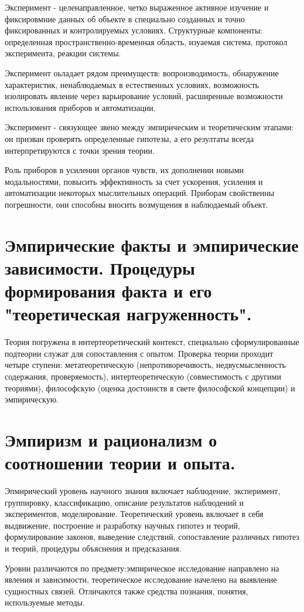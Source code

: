 \documentclass[12pt, specialist, subf, substylefile = spbu.rtx]{disser}
\begin{document}
Эксперимент - целенаправленное, четко выраженное активное изучение и фиксировмние данных об объекте в специально созданных и точно фиксированных и контролируемых условиях. Структурные компоненты: определенная пространственно-временная область, изуаемая система, протокол эксперимента, реакции системы.

Эксперимент оьладает рядом преимуществ: вопроизводимость, обнаружение характеристик, ненаблюдаемых в естественных условиях, возможность изолировать явление через варьирование условий, расширенные возможности использования приборов и автоматизации.

Эксперимент - связующее звено между эмпирическим и теоретическим этапами: он призван проверять определенные гипотезы, а его резултаты всегда интерпретируются с точки зрения теории. 

Роль приборов в усилении органов чувств, их дополнении новыми модальностями, повысить эффективность за счет ускорения, усиления и автоматизации некоторых мыслительных операций. Приборам свойственны погрешности, они способны вносить возмущения в наблюдаемый объект.

\section{Эмпирические факты и эмпирические зависимости. Процедуры формирования факта и его "теоретическая нагруженность".}

Теория погружена в интертеоретический контекст, специально сформулированные подтеории служат для сопоставления с опытом. Проверка теории проходит четыре ступени: метатеоретическую (непротиворечивость, недвусмысленность содержания, проверяемость), интертеоретическую (совместимость с другими теориями), философскую (оценка достоинств в свете философской концепции) и эмпирическую. 

\section{Эмпиризм и рационализм о соотношении теории и опыта.}
Эпмирический уровень научного знания включает наблюдение, эксперимент, группировку, классификацию, описание результатов наблюдений и экспериментов, моделирование. Теоретический уровень включает в себя выдвижение, построение и разработку научных гипотез и теорий, формулирование законов, выведение следствий, сопоставление различных гипотез и теорий, процедуры объяснения и предсказания.

Уровни различаются по предмету:эмпирическое исследование направлено на явления и зависимости, теоретическое исследование начелено на выявление сущностных связей. Отличаются также средства познания, понятия, используемые методы.
\end{document}
